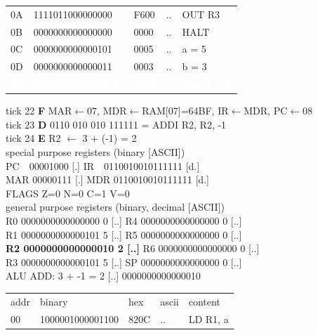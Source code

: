 \begin{tcolorbox}[stepbox, title={Instruction 7 \hfill ticks 19 to 21 \quad ST R3, result}]
{\begin{tabular}{@{}lllll@{}}
0A & 1111011000000000 & F600 & .. & OUT R3\\
0B & 0000000000000000 & 0000 & .. & HALT\\
\rowcolor{datac}0C & 0000000000000101 & 0005 & .. & a = 5\\
\rowcolor{datac}0D & 0000000000000011 & 0003 & .. & b = 3\\
\rowcolor{wrt}\textcolor{white}{\textbf{0E}} & \textcolor{white}{\textbf{0000000000000101}} & \textcolor{white}{\textbf{0005}} & \textcolor{white}{\textbf{..}} & \textcolor{white}{\textbf{result = 5}}\\
\end{tabular}}
\end{tcolorbox}\hfill\begin{tcolorbox}[stepbox, title={Instruction 8 \hfill ticks 22 to 24 \quad ADDI R2, R2, -1}]
\textcolor{dim}{tick 22} \textbf{F} MAR$\leftarrow$07, MDR$\leftarrow$RAM[07]=64BF, IR$\leftarrow$MDR, PC$\leftarrow$08\\
\textcolor{dim}{tick 23} \textbf{D} 0110 010 010 111111 = ADDI R2, R2, -1\\
\textcolor{dim}{tick 24} \textbf{E} R2 $\leftarrow$ 3 + (-1) = 2\\[2pt]
\textcolor{dim}{special purpose registers (binary [ASCII])}\\
PC~~00001000 [.] \hfill IR~~0110010010111111 [d.]\\
MAR 00000111 [.] \hfill MDR 0110010010111111 [d.]\\
FLAGS Z=0 N=0 C=1 V=0\\[2pt]
\textcolor{dim}{general purpose registers (binary, decimal [ASCII])}\\
R0 0000000000000000 0 [..] \hfill R4 0000000000000000 0 [..]\\
R1 0000000000000101 5 [..] \hfill R5 0000000000000000 0 [..]\\
\textcolor{wrt}{\textbf{R2 0000000000000010 2 [..]}} \hfill R6 0000000000000000 0 [..]\\
R3 0000000000000101 5 [..] \hfill SP 0000000000000000 0 [..]\\
\textcolor{dim}{ALU} ADD: 3 + -1 = 2 [..] \hfill 0000000000000010\\[2pt]
{\setlength{\tabcolsep}{2pt}\begin{tabular}{@{}lllll@{}}
\textcolor{dim}{addr} & \textcolor{dim}{binary} & \textcolor{dim}{hex} & \textcolor{dim}{ascii} & \textcolor{dim}{content}\\
00 & 1000001000001100 & 820C & .. & LD R1, a\\

\end{tabular}}
\end{tcolorbox}
